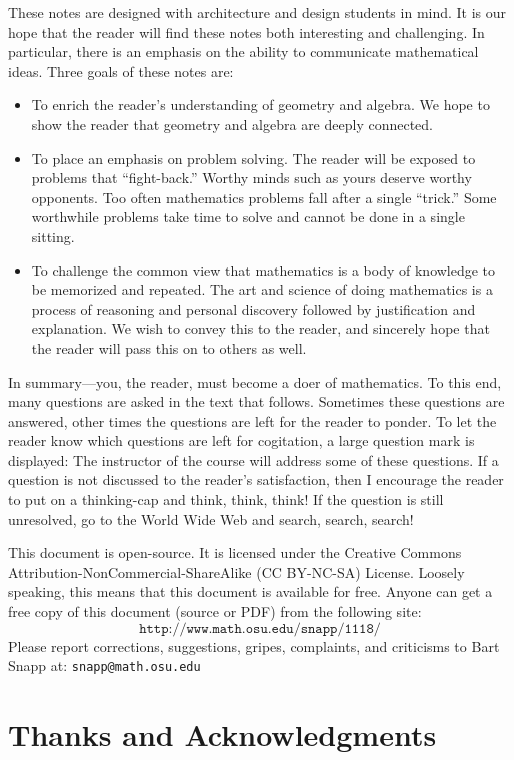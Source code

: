 These notes are designed with architecture and design students in
mind.  It is our hope that the reader will find these notes both
interesting and challenging.  In particular, there is an emphasis on
the ability to communicate mathematical ideas.  Three goals of these
notes are:
\begin{itemize}
\item To enrich the reader's understanding of geometry and algebra. 
We hope to show the reader that geometry and algebra are deeply
connected.
\item To place an emphasis on problem solving. The reader will be exposed 
to problems that ``fight-back.'' Worthy minds such as yours deserve
worthy opponents. Too often mathematics problems fall after a single
``trick.'' Some worthwhile problems take time to solve and cannot be
done in a single sitting.
\item To challenge the common view that mathematics is a body of knowledge 
to be memorized and repeated. The art and science of doing mathematics
is a process of reasoning and personal discovery followed by
justification and explanation. We wish to convey this to the reader,
and sincerely hope that the reader will pass this on to others as
well.
\end{itemize}
In summary---you, the reader, must become a doer of mathematics.  To
this end, many questions are asked in the text that follows. Sometimes
these questions are answered, other times the questions are left for
the reader to ponder. To let the reader know which questions are left
for cogitation, a large question mark is displayed:
\QM
The instructor of the course will address some of these questions. If
a question is not discussed to the reader's satisfaction, then I
encourage the reader to put on a thinking-cap and think, think, think!
If the question is still unresolved, go to the World Wide Web and
search, search, search!

This document is open-source. It is licensed under the Creative
Commons Attribution-NonCommercial-ShareAlike (CC BY-NC-SA)
License. Loosely speaking, this means that this document is available
for free. Anyone can get a free copy of this document (source or PDF)
from the following site:
\[
\texttt{http://www.math.osu.edu/\~{}snapp/1118/}
\]
Please report corrections, suggestions, gripes, complaints, and
criticisms to Bart Snapp at: \texttt{snapp@math.osu.edu}


\section*{Thanks and Acknowledgments}

